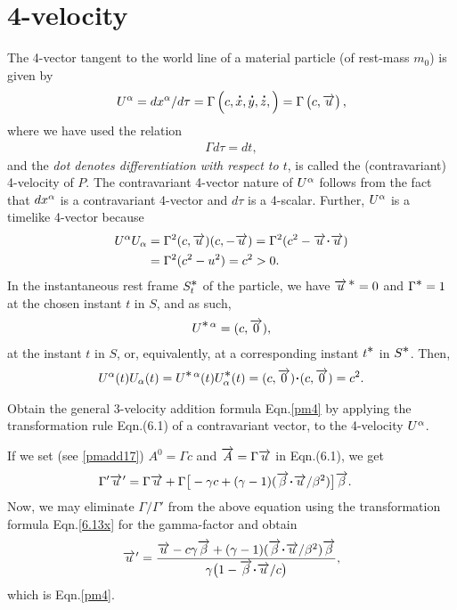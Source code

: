 \section{4-velocity}
The {4-vector tangent} to the world line of a material 
particle (of rest-mass $m_0$) is given by
\begin{align}\label{pmadd17}
U^{{\alpha}}=dx^{{\alpha}}/d\tau=\Gamma\left( c, {\overset{\hspace*{1.5pt}\centerdot}{x} }, {\overset{\hspace*{1.5pt}\centerdot}{y} },
{\overset{\hspace*{1.5pt}\centerdot}{z} }, \right)
=\Gamma\left( c, \overrightarrow{u}\right),
\end{align}
where we have used the relation
\begin{align}\label{pmadd17a}
 \Gamma d\tau =dt,
\end{align}
and the \textsl{dot denotes differentiation with 
respect to 
$t$}, is called the (contravariant) {4-velocity} of 
$P$. 
The contravariant 4-vector nature of $U^{{\alpha}}$ follows 
from 
the fact that $dx^{{\alpha}}$ is a contravariant 4-vector 
and 
$d\tau$ is a 4-scalar.  Further, {$U^{{\alpha}}$ is a 
timelike 
4-vector} because
\begin{align*}
U^\gka U_ \gka &=\Gamma^2(c,\veca{u})(c,-\veca{u})
=\Gamma^2(c^2
-\veca{u}\dotp\veca{u})\\&=\Gamma^2(c^2 -u^2)=c^2>0.
\end{align*}
In the instantaneous rest frame $S^{{\textstyle \ast}}_t$ of the 
particle, we have ${\overrightarrow{u}^{\,{\textstyle \ast}}}=0$ and $\Gamma^{\textstyle \ast}=1$ at 
the 
chosen instant $t$ in $S$,  and as such,
\begin{align}\label{pmadd18}
U^{{\textstyle \ast}\, {\alpha}} =( c, \overrightarrow{0}),
\end{align}
at the instant $t$ in $S$, or, equivalently, at a 
corresponding instant $t^{{\textstyle \ast}}$ in $S^{{\textstyle \ast}}$. Then,
\begin{align}\label{pmadd19}
U^\gka( t)U_ \gka( t) =U^{\bst\, \gka}(t)
U^\bst_ \gka(t)=(c,\veca{0})\dotp
(c, \veca{0})=c^2.
\end{align}

\exm Obtain the general 3-velocity addition formula 
Eqn.\eqref{pm4} by applying the transformation rule 
Eqn.(6.1) of a contravariant vector, to the 4-velocity 
$U^{{\alpha}}$. 

\soln If we set (see \eqref{pmadd17}) $A^0=\Gamma c$ 
and 
$\overrightarrow{A}=\Gamma \overrightarrow{u}$ in Eqn.(6.1), we get 
\begin{align*}
 &\Gamma' \pvec{u}= \Gamma\veca{u}+\Gamma\big[-\gkg c
+(\gkg-1)(\veca{\gkb}\dotp 
\veca{u}/\gkb^2)\big]\veca{\gkb}.
\end{align*}
Now, we may eliminate $\Gamma/\Gamma'$ from the above 
equation using the transformation formula  
Eqn.\eqref{6.13x} 
for the gamma-factor  and obtain
\begin{align*}
\pvec{u}= \frac{\veca{u}-c\gkg \veca{\gkb}
+(\gkg-1)(\veca{\gkb}\dotp
\veca{u}/\gkb^2)\veca{\gkb}}{\gkg\big(1-\veca{\gkb}
\dotp\veca{u}/c\big) },
\end{align*}
which is Eqn.\eqref{pm4}. \ebx


